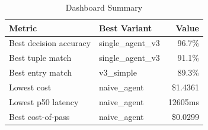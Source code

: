 \begin{table}[htbp]
\centering
\caption{Dashboard Summary}
\label{tab:summary}
\begin{tabular}{l l r}
\toprule
Metric & Best Variant & Value \\
\midrule
  Best decision accuracy & single\_agent\_v3 & 96.7\% \\
  Best tuple match & single\_agent\_v3 & 91.1\% \\
  Best entry match & v3\_simple & 89.3\% \\
  Lowest cost & naive\_agent & \$1.4361 \\
  Lowest p50 latency & naive\_agent & 12605ms \\
  Best cost-of-pass & naive\_agent & \$0.0299 \\
\bottomrule
\end{tabular}
\end{table}
